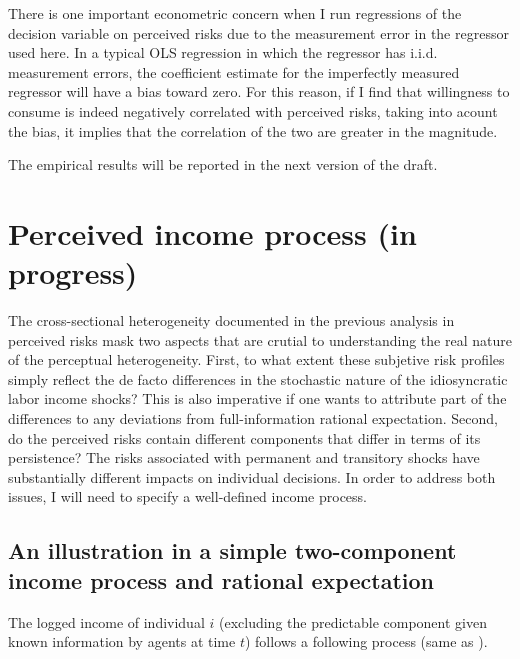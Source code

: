 \documentclass[12pt,notitlepage,onecolumn,aps,pra]{article}
\begin{document}
There is one important econometric concern when I run regressions of the
decision variable on perceived risks due to the measurement error in the
regressor used here. In a typical OLS regression in which the regressor
has i.i.d. measurement errors, the coefficient estimate for the
imperfectly measured regressor will have a bias toward zero. For this
reason, if I find that willingness to consume is indeed negatively
correlated with perceived risks, taking into acount the bias, it implies
that the correlation of the two are greater in the magnitude.

The empirical results will be reported in the next version of the draft.

    \hypertarget{perceived-income-process-in-progress}{%
\section{Perceived income process (in
progress)}\label{perceived-income-process-in-progress}}

The cross-sectional heterogeneity documented in the previous analysis in
perceived risks mask two aspects that are crutial to understanding the
real nature of the perceptual heterogeneity. First, to what extent these
subjetive risk profiles simply reflect the de facto differences in the
stochastic nature of the idiosyncratic labor income shocks? This is also
imperative if one wants to attribute part of the differences to any
deviations from full-information rational expectation. Second, do the
perceived risks contain different components that differ in terms of its
persistence? The risks associated with permanent and transitory shocks
have substantially different impacts on individual decisions. In order
to address both issues, I will need to specify a well-defined income
process.

\hypertarget{an-illustration-in-a-simple-two-component-income-process-and-rational-expectation}{%
\subsection{An illustration in a simple two-component income process and
rational
expectation}\label{an-illustration-in-a-simple-two-component-income-process-and-rational-expectation}}

The logged income of individual \(i\) (excluding the predictable
component given known information by agents at time \(t\)) follows a
following process (same as \cite{carroll1997nature}).
\end{document}
